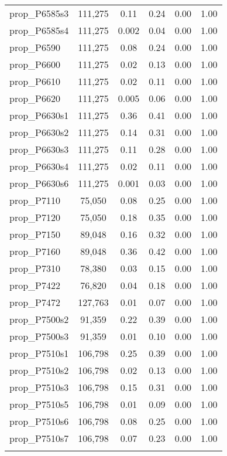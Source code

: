 \begin{table}[!htbp]
\begin{tabular}{@{\extracolsep{5pt}}lccccc}
prop\_P6585s3 & 111,275 & 0.11 & 0.24 & 0.00 & 1.00 \\ 
prop\_P6585s4 & 111,275 & 0.002 & 0.04 & 0.00 & 1.00 \\ 
prop\_P6590 & 111,275 & 0.08 & 0.24 & 0.00 & 1.00 \\ 
prop\_P6600 & 111,275 & 0.02 & 0.13 & 0.00 & 1.00 \\ 
prop\_P6610 & 111,275 & 0.02 & 0.11 & 0.00 & 1.00 \\ 
prop\_P6620 & 111,275 & 0.005 & 0.06 & 0.00 & 1.00 \\ 
prop\_P6630s1 & 111,275 & 0.36 & 0.41 & 0.00 & 1.00 \\ 
prop\_P6630s2 & 111,275 & 0.14 & 0.31 & 0.00 & 1.00 \\ 
prop\_P6630s3 & 111,275 & 0.11 & 0.28 & 0.00 & 1.00 \\ 
prop\_P6630s4 & 111,275 & 0.02 & 0.11 & 0.00 & 1.00 \\ 
prop\_P6630s6 & 111,275 & 0.001 & 0.03 & 0.00 & 1.00 \\ 
prop\_P7110 & 75,050 & 0.08 & 0.25 & 0.00 & 1.00 \\ 
prop\_P7120 & 75,050 & 0.18 & 0.35 & 0.00 & 1.00 \\ 
prop\_P7150 & 89,048 & 0.16 & 0.32 & 0.00 & 1.00 \\ 
prop\_P7160 & 89,048 & 0.36 & 0.42 & 0.00 & 1.00 \\ 
prop\_P7310 & 78,380 & 0.03 & 0.15 & 0.00 & 1.00 \\ 
prop\_P7422 & 76,820 & 0.04 & 0.18 & 0.00 & 1.00 \\ 
prop\_P7472 & 127,763 & 0.01 & 0.07 & 0.00 & 1.00 \\ 
prop\_P7500s2 & 91,359 & 0.22 & 0.39 & 0.00 & 1.00 \\ 
prop\_P7500s3 & 91,359 & 0.01 & 0.10 & 0.00 & 1.00 \\ 
prop\_P7510s1 & 106,798 & 0.25 & 0.39 & 0.00 & 1.00 \\ 
prop\_P7510s2 & 106,798 & 0.02 & 0.13 & 0.00 & 1.00 \\ 
prop\_P7510s3 & 106,798 & 0.15 & 0.31 & 0.00 & 1.00 \\ 
prop\_P7510s5 & 106,798 & 0.01 & 0.09 & 0.00 & 1.00 \\ 
prop\_P7510s6 & 106,798 & 0.08 & 0.25 & 0.00 & 1.00 \\ 
prop\_P7510s7 & 106,798 & 0.07 & 0.23 & 0.00 & 1.00 \\ 
\hline \\[-1.8ex] 
\end{tabular} 
\end{table} 
